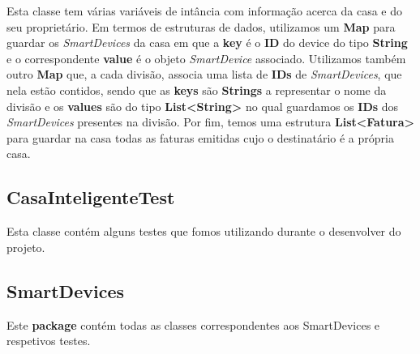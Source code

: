 \documentclass[11pt,a4paper]{report}
\begin{document}
    Esta classe tem várias variáveis de intância com informação acerca da casa e do seu proprietário. Em termos de estruturas de dados, utilizamos um \textbf{Map} para guardar os \textit{SmartDevices} da casa em que a\textbf{ key} é o\textbf{ ID} do device do tipo\textbf{ String} e o correspondente \textbf{value} é o objeto\textit{ SmartDevice} associado. Utilizamos também outro \textbf{Map} que, a cada divisão, associa uma lista de \textbf{IDs} de \textit{SmartDevices}, que nela estão contidos, sendo que as \textbf{keys} são \textbf{Strings} a representar o nome da divisão e os \textbf{values }são do tipo \textbf{List<String>} no qual guardamos os \textbf{IDs} dos \textit{SmartDevices} presentes na divisão. Por fim, temos uma estrutura \textbf{List<Fatura>} para guardar na casa todas as faturas emitidas cujo o destinatário é a própria casa. 
    
	\subsection{CasaInteligenteTest}
	
	Esta classe contém alguns testes que fomos utilizando durante o desenvolver do projeto.
	
	\subsection{SmartDevices}
	
	Este \textbf{package} contém todas as classes correspondentes aos SmartDevices e respetivos testes. 
	
\end{document}
